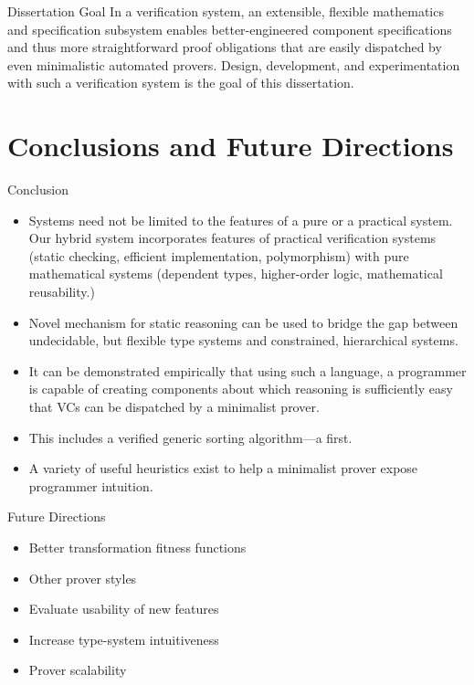 \documentclass{beamer}
\begin{document}
\begin{frame}{Dissertation Goal}
	In a verification system, an extensible, flexible mathematics and specification subsystem enables better-engineered component specifications and thus more straightforward proof obligations that are easily dispatched by even minimalistic automated provers.  Design, development, and experimentation with such a verification system is the goal of this dissertation.
\end{frame}






\section{Conclusions and Future Directions}
\begin{frame}{Conclusion}
	\begin{itemize}
		\item Systems need not be limited to the features of a pure or a practical system. Our hybrid system incorporates features of practical verification systems (static checking, efficient implementation, polymorphism) with pure mathematical systems (dependent types, higher-order logic, mathematical reusability.)
		\item Novel mechanism for static reasoning can be used to bridge the gap between undecidable, but flexible type systems and constrained, hierarchical systems.
		\item It can be demonstrated empirically that using such a language, a programmer is capable of creating components about which reasoning is sufficiently easy that VCs can be dispatched by a minimalist prover.
		\item This includes a verified generic sorting algorithm---a first.
		\item A variety of useful heuristics exist to help a minimalist prover expose programmer intuition.
	\end{itemize}
\end{frame}

\begin{frame}{Future Directions}
	\begin{itemize}
		\item Better transformation fitness functions
		\item Other prover styles
		\item Evaluate usability of new features
		\item Increase type-system intuitiveness
		\item Prover scalability
	\end{itemize}
\end{frame}
\end{document}
